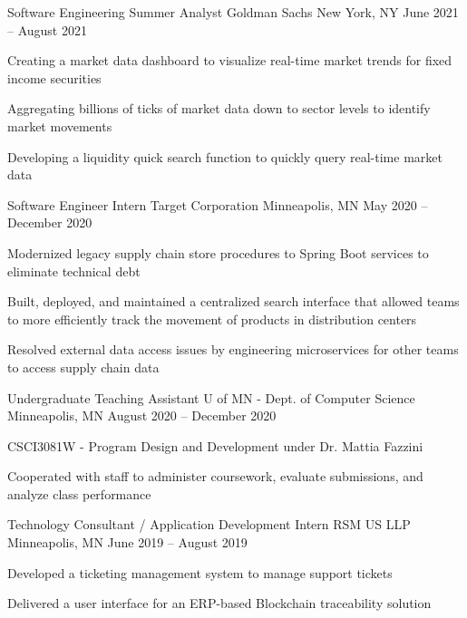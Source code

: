 \documentclass[]{awesome-cv}
\begin{document}
\vspace{-9mm}
\begin{cventries}
    \cventry
	{Software Engineering Summer Analyst}
	{Goldman Sachs}
	{New York, NY}
	{June 2021 – August 2021}
	{\begin{cvitems}
		\item {Creating a market data dashboard to visualize real-time market trends for fixed income securities}
		\item {Aggregating billions of ticks of market data down to sector levels to identify market movements}
		\item {Developing a liquidity quick search function to quickly query real-time market data}
		\end{cvitems}}
	\cventry
	{Software Engineer Intern}
	{Target Corporation}
	{Minneapolis, MN}
	{May 2020 – December 2020}
	{\begin{cvitems}
		\item {Modernized legacy supply chain store procedures to Spring Boot services to eliminate technical debt}
		\item {Built, deployed, and maintained a centralized search interface that allowed teams to more efficiently track the movement of products in distribution centers}
		\item {Resolved external data access issues by engineering microservices for other teams to access supply chain data}
		\end{cvitems}}
	\cventry
	{Undergraduate Teaching Assistant}
	{U of MN - Dept. of Computer Science}
	{Minneapolis, MN}
	{August 2020 – December 2020}
	{\begin{cvitems}
    	\item {CSCI3081W - Program Design and Development under Dr. Mattia Fazzini}
		\item {Cooperated with staff to administer coursework, evaluate submissions, and analyze class performance}
		\end{cvitems}}
	\cventry
	{Technology Consultant / Application Development Intern}
	{RSM US LLP}
	{Minneapolis, MN}
	{June 2019 – August 2019}
	{\begin{cvitems}
		\item {Developed a ticketing management system to manage support tickets}
		\item {Delivered a user interface for an ERP-based Blockchain traceability solution}
		\end{cvitems}}

\end{cventries}
\end{document}
